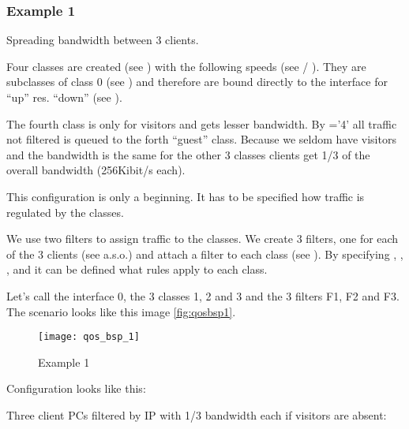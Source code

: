 \subsubsection{Example 1}



   Spreading bandwidth between 3 clients.

   Four classes are created (see ) with the following speeds
   (see  / ).
   They are subclasses of class 0 (see ) and therefore
   are bound directly to the interface for ``up'' res. ``down''
   (see ).

   The fourth class is only for visitors and gets lesser bandwidth.
   By ='4' all traffic not
   filtered is queued to the forth ``guest'' class. Because we seldom
   have visitors and the bandwidth is the same for the other 3 classes
   clients get 1/3 of the overall bandwidth (256Kibit/s each).

   This configuration is only a beginning. It has to be specified how
   traffic is regulated by the classes.

   We use two filters to assign traffic to the classes. We create 3 filters,
   one for each of the 3 clients (see  a.s.o.) and
   attach a filter to each class (see ).
   By specifying ,
   , ,
    and 
   it can be defined what rules apply to each class.

   Let's call the interface 0, the 3 classes 1, 2 and 3 and the 3 filters F1,
   F2 and F3. The scenario looks like this image \ref{fig:qosbsp1}.

   \begin{figure}[htbp]
     \centering
     \texttt{[image: qos\_bsp\_1]}
     \caption{Example 1}
   \end{figure}


   Configuration looks like this:

   Three client PCs filtered by IP with 1/3 bandwidth each if
   visitors are absent:

